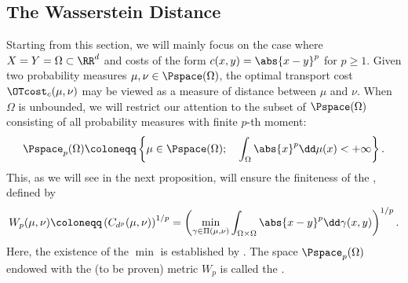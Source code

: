 \documentclass[oneside,reqno,letterpaper]{amsart}
\begin{document}
\subsection{The Wasserstein Distance}
Starting from this section, we will mainly focus on the case where \(X = Y = \Omega \subset \RR^d\) and costs of the form \(c(x, y) = \abs{x - y}^p\) for \(p \geq 1\).
Given two probability measures \(\mu, \nu \in \Pspace(\Omega)\), the optimal transport cost \(\OTcost_c(\mu, \nu)\) may be viewed as a measure of distance between \(\mu\) and \(\nu\).
When \(\Omega\) is unbounded, we will restrict our attention to the subset of \(\Pspace(\Omega)\) consisting of all probability measures with finite \(p\)-th moment:
\[
  \Pspace_p(\Omega) \coloneqq \left\{ \mu \in \Pspace(\Omega); \quad \int_{\Omega} \abs{x}^p \dd \mu(x) < +\infty \right\}.
\]
This, as we will see in the next proposition, will ensure the finiteness of the , defined by
\[
  W_p(\mu, \nu)
  \coloneqq \left( C_{d^p}(\mu, \nu) \right)^{1/p}
  = \left( \min_{\gamma \in \Pi(\mu, \nu)} \int_{\Omega \times \Omega} \abs{x - y}^p \dd \gamma(x, y) \right)^{1/p}.
\]
Here, the existence of the \(\min\) is established by .
The space \(\Pspace_p(\Omega)\) endowed with the (to be proven) metric \(W_p\) is called the .
\end{document}

